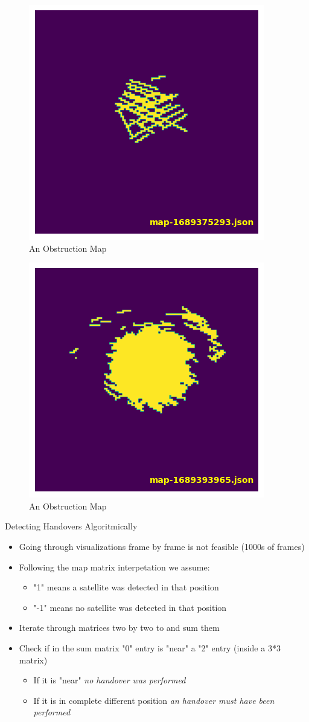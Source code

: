 \documentclass[NET,english,beameralt]{tumbeamer}
\begin{document}
\begin{frame}[fragile]
    \begin{figure}
        \includegraphics[width=0.4\columnwidth]{pics/map3.png}
        \caption{An Obstruction Map}
    \end{figure}
\end{frame}

\begin{frame}[fragile]
    \begin{figure}
        \includegraphics[width=0.4\columnwidth]{pics/map4.png}
        \caption{An Obstruction Map}
    \end{figure}
\end{frame}

\begin{frame}{Detecting Handovers Algoritmically}
    \begin{itemize}
        \item Going through visualizations frame by frame is not feasible (1000s of frames)
        \item Following the map matrix interpetation we assume:
        \begin{itemize}
            \item "1" means a satellite was detected in that position
            \item  "-1" means no satellite was detected in that position
        \end{itemize} 
        \item Iterate through matrices two by two to and sum them
        \item Check if in the sum matrix "0" entry is "near" a "2" entry (inside a 3*3 matrix)
            \begin{itemize}
                \item If it is "near" \emph{no handover was performed}
                \item If it is in complete different position \emph{an handover must have been performed}
            \end{itemize}
    \end{itemize}
\end{frame}
\end{document}
